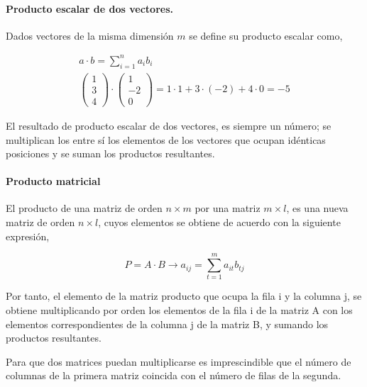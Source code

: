 \paragraph{Producto escalar de dos vectores.} Dados vectores de la misma dimensión $m$ se define su producto escalar como, 

\begin{gather*}
a\cdot b=\sum_{i=1}^na_ib_i\\
\begin{pmatrix}
1\\
3\\
4
\end{pmatrix}\cdot
\begin{pmatrix}
1\\
-2\\
0
\end{pmatrix}
=1\cdot 1+3 \cdot (-2)+ 4 \cdot 0= -5
\end{gather*}

El resultado de producto escalar de dos vectores, es siempre un número; se multiplican los entre sí los elementos de los vectores que ocupan idénticas posiciones y se suman los productos resultantes. 


\paragraph{Producto matricial}
El producto de una matriz de orden $n\times m$ por una matriz $m\times l$, es una nueva matriz de orden $n\times l$, cuyos elementos se obtiene de acuerdo con la siguiente expresión,

\begin{equation*}
P=A\cdot B \rightarrow a_{ij}=\sum_{t=1}^m a_{it}b_{tj}
\end{equation*}

Por tanto, el elemento de la matriz producto que ocupa la fila i y la columna j, se obtiene multiplicando por orden los elementos de la fila i de la matriz A con los elementos correspondientes de la columna j de la matriz B, y sumando los productos resultantes.

Para que dos matrices puedan multiplicarse es imprescindible que el número de columnas de la primera matriz coincida con el número de filas de la segunda.

